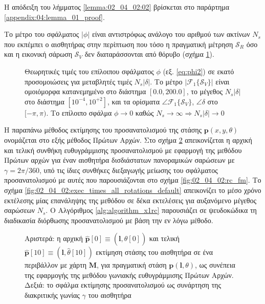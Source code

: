 Η απόδειξη του λήμματος \ref{lemma:02_04_02:02} βρίσκεται στο παράρτημα
\ref{appendix:04:lemma_01_proof}.

\begin{corollary}
  Το μέτρο του σφάλματος $|\phi|$ είναι αντιστρόφως ανάλογο του αριθμού των
  ακτίνων $N_s$ που εκπέμπει ο αισθητήρας στην περίπτωση που τόσο η πραγματική
  μέτρηση $\mathcal{S}_R$ όσο και η εικονική σάρωση $\mathcal{S}_V$ δεν
  διαταράσσονται από θόρυβο (σχήμα \ref{fig:02_04_02:phi_rc_x1}).
\end{corollary}


\begin{figure}[!h]\centering
  \vspace{0.5cm}
  
  \vspace{1.0cm}
  \caption{\small Θεωρητικές τιμές του επίλοιπου σφάλματος $\phi$ (εξ.
           \ref{eq:phi2}) σε εκατό προσομοιώσεις για μεταβλητές τιμές
           $N_s |\delta|$. Το μέτρο $|\mathcal{F}_1\{\mathcal{S}_V\}|$ είναι
           ομοιόμορφα κατανεμημένο στο διάστημα $[0.0, 200.0]$, το μέγεθος
           $N_s |\delta|$ στο διάστημα $[10^{-4}, 10^{+2}]$, και τα ορίσματα
           $\angle \mathcal{F}_1\{\mathcal{S}_V\}$, $\angle \delta$ στο
           $[-\pi, \pi)$. Το επίλοιπο σφάλμα $\phi \rightarrow 0$ καθώς
           $N_s \rightarrow \infty \Rightarrow N_s |\delta| \rightarrow 0$}
  \label{fig:02_04_02:phi_rc_x1}
\end{figure}

Η παραπάνω μέθοδος εκτίμησης του προσανατολισμού της στάσης
$\bm{p}(x,y,\theta)$ ονομάζεται στο εξής μέθοδος Πρώτων Αρχών.  Στο σχήμα
\ref{fig:02_04_02:rc_x1} απεικονίζεται η αρχική και τελική συνθήκη
ευθυγράμμισης προσανατολισμού με εφαρμογή της μεθόδου Πρώτων αρχών για έναν
αισθητήρα δισδιάστατων πανοραμικών σαρώσεων με $\gamma = 2\pi/360$, υπό τις
ίδιες συνθήκες διεξαγωγής μείωσης του σφάλματος προσανατολισμού με αυτές που
παρουσιάζονται στο σχήμα \ref{fig:02_04_02:rc_fm}. Το σχήμα
\ref{fig:02_04_02:exec_times_all_rotations_default} απεικονίζει το μέσο χρόνο
εκτέλεσης μίας επανάληψης της μεθόδου σε δέκα εκτελέσεις για αυξανόμενο μέγεθος
σαρώσεων $N_s$. Ο Αλγόριθμος \ref{alg:algorithm_x1rc} παρουσιάζει σε
ψευδοκώδικα τη διαδικασία διόρθωσης προσανατολισμού με βάση την εν λόγω μέθοδο.

\begin{figure}[!h]\centering
  \vspace{0.5cm}
  
  \vspace{0.5cm}
  \caption{\small Αριστερά: η αρχική
           $\hat{\bm{p}}[0] \equiv (\bm{l},\hat{\theta}[0])$ και τελική
           $\hat{\bm{p}}[10] \equiv (\bm{l},\hat{\theta}[10])$ εκτίμηση στάσης
           του αισθητήρα σε ένα περιβάλλον με χάρτη $\bm{M}$, για πραγματική
           στάση $\bm{p}(\bm{l},\theta)$, ως συνέπεια της εφαρμογής της μεθόδου
           γωνιακής ευθυγράμμισης Πρώτων Αρχών. Δεξιά: το σφάλμα εκτίμησης
           προσανατολισμού ως συνάρτηση της διακριτικής γωνίας $\gamma$ του
           αισθητήρα}
  \label{fig:02_04_02:rc_x1}
\end{figure}


